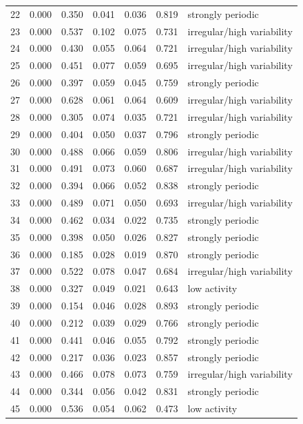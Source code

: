\begin{longtable}{lrrrrrl}
22 & 0.000 & 0.350 & 0.041 & 0.036 & 0.819 & strongly periodic \\
23 & 0.000 & 0.537 & 0.102 & 0.075 & 0.731 & irregular/high variability \\
24 & 0.000 & 0.430 & 0.055 & 0.064 & 0.721 & irregular/high variability \\
25 & 0.000 & 0.451 & 0.077 & 0.059 & 0.695 & irregular/high variability \\
26 & 0.000 & 0.397 & 0.059 & 0.045 & 0.759 & strongly periodic \\
27 & 0.000 & 0.628 & 0.061 & 0.064 & 0.609 & irregular/high variability \\
28 & 0.000 & 0.305 & 0.074 & 0.035 & 0.721 & irregular/high variability \\
29 & 0.000 & 0.404 & 0.050 & 0.037 & 0.796 & strongly periodic \\
30 & 0.000 & 0.488 & 0.066 & 0.059 & 0.806 & irregular/high variability \\
31 & 0.000 & 0.491 & 0.073 & 0.060 & 0.687 & irregular/high variability \\
32 & 0.000 & 0.394 & 0.066 & 0.052 & 0.838 & strongly periodic \\
33 & 0.000 & 0.489 & 0.071 & 0.050 & 0.693 & irregular/high variability \\
34 & 0.000 & 0.462 & 0.034 & 0.022 & 0.735 & strongly periodic \\
35 & 0.000 & 0.398 & 0.050 & 0.026 & 0.827 & strongly periodic \\
36 & 0.000 & 0.185 & 0.028 & 0.019 & 0.870 & strongly periodic \\
37 & 0.000 & 0.522 & 0.078 & 0.047 & 0.684 & irregular/high variability \\
38 & 0.000 & 0.327 & 0.049 & 0.021 & 0.643 & low activity \\
39 & 0.000 & 0.154 & 0.046 & 0.028 & 0.893 & strongly periodic \\
40 & 0.000 & 0.212 & 0.039 & 0.029 & 0.766 & strongly periodic \\
41 & 0.000 & 0.441 & 0.046 & 0.055 & 0.792 & strongly periodic \\
42 & 0.000 & 0.217 & 0.036 & 0.023 & 0.857 & strongly periodic \\
43 & 0.000 & 0.466 & 0.078 & 0.073 & 0.759 & irregular/high variability \\
44 & 0.000 & 0.344 & 0.056 & 0.042 & 0.831 & strongly periodic \\
45 & 0.000 & 0.536 & 0.054 & 0.062 & 0.473 & low activity \\

\end{longtable}
